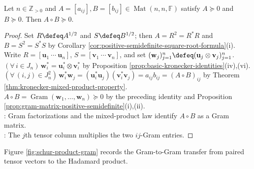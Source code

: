 \begin{theorem} \label{thm:schur-product-theorem} \\
Let $n\in\mathbb{Z}_{>0}$ and $A=[a_{ij}],B=[b_{ij}]\in\operatorname{Mat}(n,n,\mathbb{F})$ satisfy $A\succeq0$ and $B\succeq0$. Then $A\circ B\succeq0$.
\begin{proof}
Set $R\defeq A^{1/2}$ and $S\defeq B^{1/2}$; then $A=R^2=R^*R$ and $B=S^2=S^*S$ by Corollary \ref{cor:positive-semidefinite-square-root-formula}(i).\\
Write $R=[\mathbf{u}_1\ \cdots\ \mathbf{u}_n]$, $S=[\mathbf{v}_1\ \cdots\ \mathbf{v}_n]$, and set $(\mathbf{w}_j)_{j=1}^{n}\defeq(\mathbf{u}_j\otimes\mathbf{v}_j)_{j=1}^{n}$. $(\forall\,i\in J_n)\,\mathbf{w}_i^*=\mathbf{u}_i^*\otimes\mathbf{v}_i^*$ by Proposition \ref{prop:basic-kronecker-identities}(iv),(vi).\\
$(\forall\,(i,j)\in J_n^2)\,\mathbf{w}_i^*\mathbf{w}_j=(\mathbf{u}_i^*\mathbf{u}_j)(\mathbf{v}_i^*\mathbf{v}_j)=a_{ij}b_{ij}=(A\circ B)_{ij}$ by Theorem \ref{thm:kronecker-mixed-product-property}.\\
$A\circ B=\operatorname{Gram}(\mathbf{w}_1,\ldots,\mathbf{w}_n)\succeq0$ by the preceding identity and Proposition \ref{prop:gram-matrix-positive-semidefinite}(i),(ii).\\
: Gram factorizations and the mixed-product law identify $A\circ B$ as a Gram matrix.\\
: The $j$th tensor column multiplies the two $ij$-Gram entries.
\end{proof}
\end{theorem}

Figure \ref{fig:schur-product-gram} records the Gram-to-Gram transfer from paired tensor vectors to the Hadamard product.

\begin{illustrationfigure}[H]
  \centering
  
  \caption{The paired vectors $\mathbf{u}_j\otimes\mathbf{v}_j$ form a Gram representation of $A\circ B$.}
  \label{fig:schur-product-gram}
\end{illustrationfigure}


